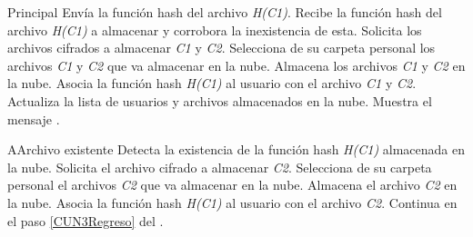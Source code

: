 \begin{UCtrayectoria}{Principal}
	\UCpaso [\UCactor] Envía la función hash del archivo \textit{H(C1)}.
	\UCpaso Recibe la función hash del archivo \textit{H(C1)} a almacenar y corrobora la inexistencia de esta. 
	\UCpaso Solicita los archivos cifrados a almacenar \textit{C1} y \textit{C2}.
	\UCpaso [\UCactor] Selecciona de su carpeta personal los archivos \textit{C1} y \textit{C2} que va almacenar en la nube.
	\UCpaso Almacena los archivos \textit{C1} y \textit{C2} en la nube. 
	\UCpaso Asocia la función hash \textit{H(C1)} al usuario con el archivo \textit{C1} y \textit{C2}. 
	\UCpaso Actualiza la lista de usuarios y archivos almacenados en la nube. \label{CUN3Regreso}
	\UCpaso Muestra el mensaje .	
\end{UCtrayectoria}


		
\begin{UCtrayectoriaA}{A}{Archivo existente}
	\UCpaso Detecta la existencia de la función hash \textit{H(C1)} almacenada en la nube. 
	\UCpaso Solicita el archivo cifrado a almacenar \textit{C2}.
	\UCpaso [\UCactor] Selecciona de su carpeta personal el archivos \textit{C2} que va almacenar en la nube.
	\UCpaso Almacena el archivo \textit{C2} en la nube. 
	\UCpaso Asocia la función hash \textit{H(C1)} al usuario con el archivo \textit{C2}. 
	\UCpaso Continua en el paso \ref{CUN3Regreso} del .
\end{UCtrayectoriaA}

